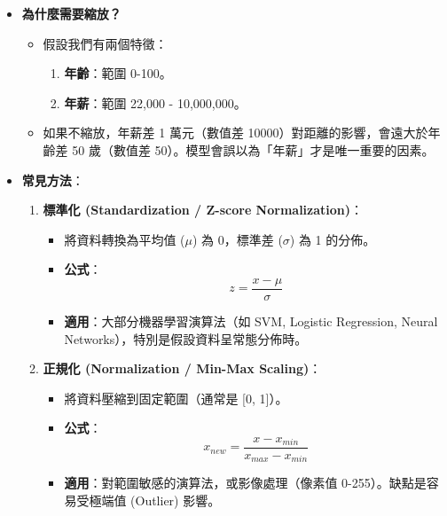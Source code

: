 \documentclass[
  letterpaper,
  DIV=11,
  numbers=noendperiod]{scrreprt}
\providecommand{\tightlist}{%
  \setlength{\itemsep}{0pt}\setlength{\parskip}{0pt}}
\begin{document}
\begin{itemize}
\tightlist
\item
  \textbf{為什麼需要縮放？}

  \begin{itemize}
  \tightlist
  \item
    假設我們有兩個特徵：

    \begin{enumerate}
    \def\labelenumi{\arabic{enumi}.}
    \tightlist
    \item
      \textbf{年齡}：範圍 0-100。
    \item
      \textbf{年薪}：範圍 22,000 - 10,000,000。
    \end{enumerate}
  \item
    如果不縮放，年薪差 1 萬元（數值差
    10000）對距離的影響，會遠大於年齡差 50 歲（數值差
    50）。模型會誤以為「年薪」才是唯一重要的因素。
  \end{itemize}
\item
  \textbf{常見方法}：

  \begin{enumerate}
  \def\labelenumi{\arabic{enumi}.}
  \tightlist
  \item
    \textbf{標準化 (Standardization / Z-score Normalization)}：

    \begin{itemize}
    \tightlist
    \item
      將資料轉換為平均值 (\(\mu\)) 為 0，標準差 (\(\sigma\)) 為 1
      的分佈。
    \item
      \textbf{公式}：\[ z = \frac{x - \mu}{\sigma} \]
    \item
      \textbf{適用}：大部分機器學習演算法（如 SVM, Logistic Regression,
      Neural Networks），特別是假設資料呈常態分佈時。
    \end{itemize}
  \item
    \textbf{正規化 (Normalization / Min-Max Scaling)}：

    \begin{itemize}
    \tightlist
    \item
      將資料壓縮到固定範圍（通常是 {[}0, 1{]}）。
    \item
      \textbf{公式}：\[ x_{new} = \frac{x - x_{min}}{x_{max} - x_{min}} \]
    \item
      \textbf{適用}：對範圍敏感的演算法，或影像處理（像素值
      0-255）。缺點是容易受極端值 (Outlier) 影響。
    \end{itemize}
  \end{enumerate}
\end{itemize}
\end{document}
